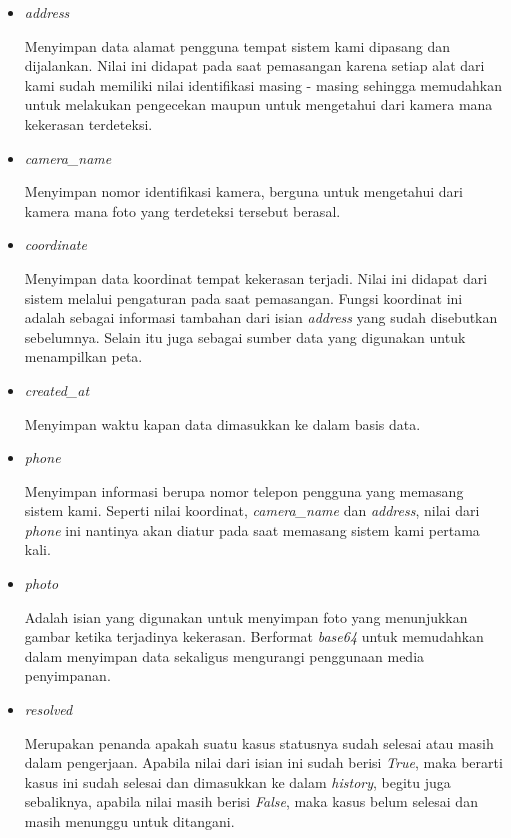 \begin{itemize}
  \item \textit{address}

        Menyimpan data alamat pengguna tempat sistem kami dipasang dan dijalankan. Nilai ini didapat pada saat pemasangan karena setiap alat dari kami sudah memiliki nilai identifikasi masing - masing sehingga memudahkan untuk melakukan pengecekan maupun untuk mengetahui dari kamera mana kekerasan terdeteksi.

  \item \textit{camera\_name}

        Menyimpan nomor identifikasi kamera, berguna untuk mengetahui dari kamera mana foto yang terdeteksi tersebut berasal.

  \item \textit{coordinate}

        Menyimpan data koordinat tempat kekerasan terjadi. Nilai ini didapat dari sistem melalui pengaturan pada saat pemasangan. Fungsi koordinat ini adalah sebagai informasi tambahan dari isian \textit{address} yang sudah disebutkan sebelumnya. Selain itu juga sebagai sumber data yang digunakan untuk menampilkan peta.

  \item \textit{created\_at}

        Menyimpan waktu kapan data dimasukkan ke dalam basis data.

  \item \textit{phone}

        Menyimpan informasi berupa nomor telepon pengguna yang memasang sistem kami. Seperti nilai koordinat, \textit{camera\_name} dan \textit{address}, nilai dari \textit{phone} ini nantinya akan diatur pada saat memasang sistem kami pertama kali.

  \item \textit{photo}

        Adalah isian yang digunakan untuk menyimpan foto yang menunjukkan gambar ketika terjadinya kekerasan. Berformat \textit{base64}  untuk memudahkan dalam menyimpan data sekaligus mengurangi penggunaan media penyimpanan.

  \item \textit{resolved}

        Merupakan penanda apakah suatu kasus statusnya sudah selesai atau masih dalam pengerjaan. Apabila nilai dari isian ini sudah berisi \textit{True}, maka berarti kasus ini sudah selesai dan dimasukkan ke dalam \textit{history}, begitu juga sebaliknya, apabila nilai masih berisi \textit{False}, maka kasus belum selesai dan masih menunggu untuk ditangani.


\end{itemize}
